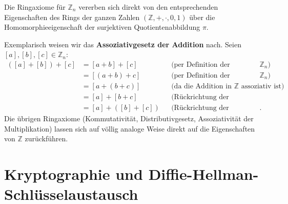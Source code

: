 \begin{math-stroke}
\begin{short-proof}
Die Ringaxiome für $\mathbb{Z}_n$ vererben sich direkt von den entsprechenden Eigenschaften des Rings der ganzen Zahlen $(\mathbb{Z}, +, \cdot, 0, 1)$ über die Homomorphieeigenschaft der surjektiven Quotientenabbildung $\pi$.

\par\vspace{1ex}\noindent
Exemplarisch weisen wir das \textbf{Assoziativgesetz der Addition} nach. Seien $[a], [b], [c] \in \mathbb{Z}_n$:
\begin{align*}
([a] + [b]) + [c] &= [a + b] + [c] && \text{(per Definition der Addition in $\mathbb{Z}_n$)} \\
&= [(a + b) + c] && \text{(per Definition der Addition in $\mathbb{Z}_n$)} \\
&= [a + (b + c)] && \text{(da die Addition in $\mathbb{Z}$ assoziativ ist)} \\
&= [a] + [b + c] && \text{(Rückrichtung der Definition)} \\
&= [a] + ([b] + [c]) && \text{(Rückrichtung der Definition)}.
\end{align*}
Die übrigen Ringaxiome (Kommutativität, Distributivgesetz, Assoziativität der Multiplikation) lassen sich auf völlig analoge Weise direkt auf die Eigenschaften von $\mathbb{Z}$ zurückführen.
\end{short-proof}
\end{math-stroke}

\section{Kryptographie und Diffie-Hellman-Schlüsselaustausch}

